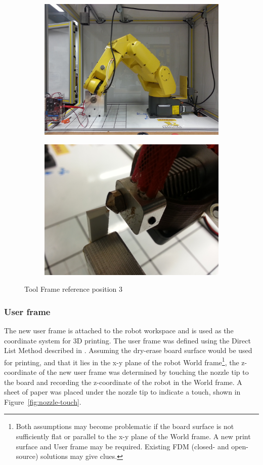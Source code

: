 \begin{figure}
    \centering
    \begin{subfigure}{.5\textwidth}
        \centering
        \includegraphics[width=.8\linewidth]{figures/tool-pt-3}
    \end{subfigure}%
    \begin{subfigure}{.5\textwidth}
        \centering
        \includegraphics[width=.8\linewidth]{figures/tool-pt-3-close}
    \end{subfigure}
    \caption{Tool Frame reference position 3}
    \label{fig:tool-pt-3}
\end{figure}

\subsubsection{User frame}
The new user frame is attached to the robot workspace and is used as the coordinate system for 3D printing. The user frame was defined using the Direct List Method described in \cite[sec~3.9.2]{lr-handling-tool}. Assuming the dry-erase board surface would be used for printing, and that it lies in the x-y plane of the robot World frame\footnote{Both assumptions may become problematic if the board surface is not sufficiently flat or parallel to the x-y plane of the World frame. A new print surface and User frame may be required. Existing FDM (closed- and open-source) solutions may give clues.}, the z-coordinate of the new user frame was determined by touching the nozzle tip to the board and recording the z-coordinate of the robot in the World frame. A sheet of paper was placed under the nozzle tip to indicate a touch, shown in Figure~\ref{fig:nozzle-touch}. 


